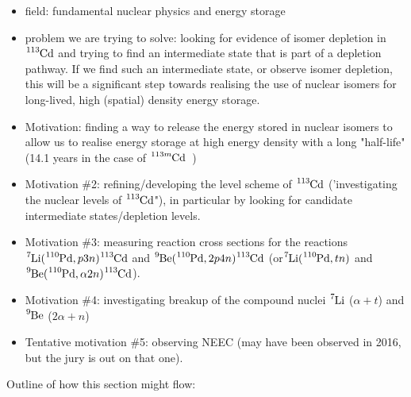\documentclass[12pt,a4paper]{article}
\begin{document}
\begin{itemize}
\item field: fundamental nuclear physics and energy storage
\item problem we are trying to solve: looking for evidence of isomer depletion in  $\ce{^{113}Cd}$ and trying to find an intermediate state that is part of a depletion pathway. If we find such an intermediate state, or observe isomer depletion, this will be a significant step towards realising the use of nuclear isomers for long-lived, high (spatial) density energy storage.
\item Motivation: finding a way to release the energy stored in nuclear isomers to allow us to realise energy storage at high energy density with a long "half-life" (14.1 years in the case of $\ce{^{113m}Cd}$~\cite{shaffer_innovations_2018})
\item Motivation \#2: refining/developing the level scheme of $\ce{^{113}Cd}$ ('investigating the nuclear levels of  $\ce{^{113}Cd}$"), in particular by looking for candidate intermediate states/depletion levels. 
\item Motivation \#3: measuring reaction cross sections for the reactions $\ce{^{7}Li}(\ce{^{110}Pd},p3n)\ce{^{113}Cd}$ and $\ce{^{9}Be}(\ce{^{110}Pd},2p4n)\ce{^{113}Cd}$ (or$\ce{^{7}Li}(\ce{^{110}Pd},tn)$ and $\ce{^{9}Be}(\ce{^{110}Pd},\alpha 2n)\ce{^{113}Cd}$).
\item Motivation \#4: investigating breakup of the compound nuclei $\ce{^{7}Li}$ ($\alpha + t$) and $\ce{^{9}Be}$ ($2\alpha+n$)~\cite{curtis_+li_2005,von_oertzen_two-center_1996,von_oertzen_dimers_1997,soic_-decaying_2004,poletti_structure_1994}
\item Tentative motivation \#5: observing NEEC (may have been observed in 2016, but the jury is out on that one). 
\end{itemize}
Outline of how this section might flow:
\end{document}
